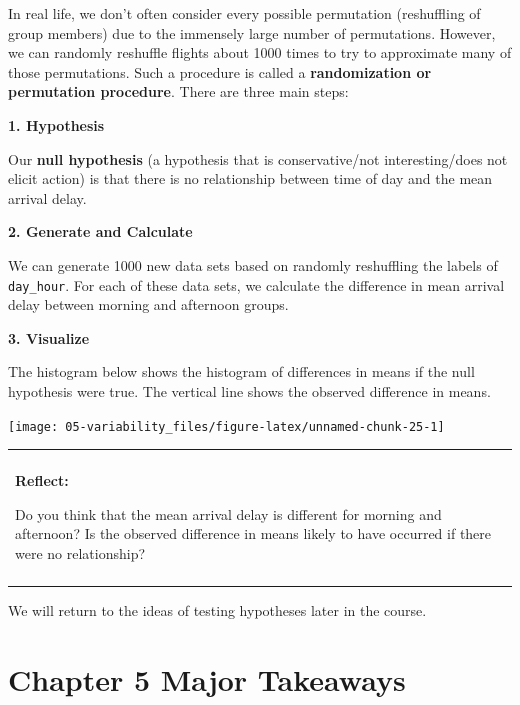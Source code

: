 \documentclass[
]{book}
\newenvironment{reflect}
{
    \begin{center}
    
    \begin{tabular}{|p{0.8\textwidth}|}
    \rowcolor{LightBlue}
    \hline\\
    \rowcolor{LightBlue}
    \textbf{Reflect:}
}
{
    \\\rowcolor{LightBlue}
    \\\hline
    \end{tabular} 
    \end{center}
}
\begin{document}
In real life, we don't often consider every possible permutation (reshuffling of group members) due to the immensely large number of permutations. However, we can randomly reshuffle flights about 1000 times to try to approximate many of those permutations. Such a procedure is called a \textbf{randomization or permutation procedure}. There are three main steps:

\textbf{1. Hypothesis}

Our \textbf{null hypothesis} (a hypothesis that is conservative/not interesting/does not elicit action) is that there is no relationship between time of day and the mean arrival delay.

\textbf{2. Generate and Calculate}

We can generate 1000 new data sets based on randomly reshuffling the labels of \texttt{day\_hour}. For each of these data sets, we calculate the difference in mean arrival delay between morning and afternoon groups.

\textbf{3. Visualize}

The histogram below shows the histogram of differences in means if the null hypothesis were true. The vertical line shows the observed difference in means.

\begin{center}\texttt{[image: 05-variability\_files/figure-latex/unnamed-chunk-25-1]} \end{center}

\begin{reflect}
Do you think that the mean arrival delay is different for morning and
afternoon? Is the observed difference in means likely to have occurred
if there were no relationship?
\end{reflect}

We will return to the ideas of testing hypotheses later in the course.

\section{Chapter 5 Major Takeaways}\label{chapter-5-major-takeaways}
\end{document}
